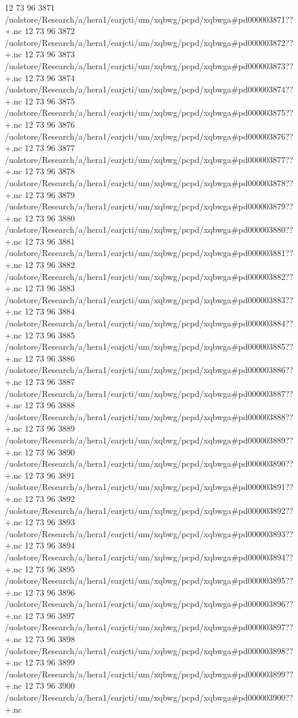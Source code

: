12 73 96
3871
/uolstore/Research/a/hera1/earjcti/um/xqbwg/pcpd/xqbwga#pd000003871??+.nc
12 73 96
3872
/uolstore/Research/a/hera1/earjcti/um/xqbwg/pcpd/xqbwga#pd000003872??+.nc
12 73 96
3873
/uolstore/Research/a/hera1/earjcti/um/xqbwg/pcpd/xqbwga#pd000003873??+.nc
12 73 96
3874
/uolstore/Research/a/hera1/earjcti/um/xqbwg/pcpd/xqbwga#pd000003874??+.nc
12 73 96
3875
/uolstore/Research/a/hera1/earjcti/um/xqbwg/pcpd/xqbwga#pd000003875??+.nc
12 73 96
3876
/uolstore/Research/a/hera1/earjcti/um/xqbwg/pcpd/xqbwga#pd000003876??+.nc
12 73 96
3877
/uolstore/Research/a/hera1/earjcti/um/xqbwg/pcpd/xqbwga#pd000003877??+.nc
12 73 96
3878
/uolstore/Research/a/hera1/earjcti/um/xqbwg/pcpd/xqbwga#pd000003878??+.nc
12 73 96
3879
/uolstore/Research/a/hera1/earjcti/um/xqbwg/pcpd/xqbwga#pd000003879??+.nc
12 73 96
3880
/uolstore/Research/a/hera1/earjcti/um/xqbwg/pcpd/xqbwga#pd000003880??+.nc
12 73 96
3881
/uolstore/Research/a/hera1/earjcti/um/xqbwg/pcpd/xqbwga#pd000003881??+.nc
12 73 96
3882
/uolstore/Research/a/hera1/earjcti/um/xqbwg/pcpd/xqbwga#pd000003882??+.nc
12 73 96
3883
/uolstore/Research/a/hera1/earjcti/um/xqbwg/pcpd/xqbwga#pd000003883??+.nc
12 73 96
3884
/uolstore/Research/a/hera1/earjcti/um/xqbwg/pcpd/xqbwga#pd000003884??+.nc
12 73 96
3885
/uolstore/Research/a/hera1/earjcti/um/xqbwg/pcpd/xqbwga#pd000003885??+.nc
12 73 96
3886
/uolstore/Research/a/hera1/earjcti/um/xqbwg/pcpd/xqbwga#pd000003886??+.nc
12 73 96
3887
/uolstore/Research/a/hera1/earjcti/um/xqbwg/pcpd/xqbwga#pd000003887??+.nc
12 73 96
3888
/uolstore/Research/a/hera1/earjcti/um/xqbwg/pcpd/xqbwga#pd000003888??+.nc
12 73 96
3889
/uolstore/Research/a/hera1/earjcti/um/xqbwg/pcpd/xqbwga#pd000003889??+.nc
12 73 96
3890
/uolstore/Research/a/hera1/earjcti/um/xqbwg/pcpd/xqbwga#pd000003890??+.nc
12 73 96
3891
/uolstore/Research/a/hera1/earjcti/um/xqbwg/pcpd/xqbwga#pd000003891??+.nc
12 73 96
3892
/uolstore/Research/a/hera1/earjcti/um/xqbwg/pcpd/xqbwga#pd000003892??+.nc
12 73 96
3893
/uolstore/Research/a/hera1/earjcti/um/xqbwg/pcpd/xqbwga#pd000003893??+.nc
12 73 96
3894
/uolstore/Research/a/hera1/earjcti/um/xqbwg/pcpd/xqbwga#pd000003894??+.nc
12 73 96
3895
/uolstore/Research/a/hera1/earjcti/um/xqbwg/pcpd/xqbwga#pd000003895??+.nc
12 73 96
3896
/uolstore/Research/a/hera1/earjcti/um/xqbwg/pcpd/xqbwga#pd000003896??+.nc
12 73 96
3897
/uolstore/Research/a/hera1/earjcti/um/xqbwg/pcpd/xqbwga#pd000003897??+.nc
12 73 96
3898
/uolstore/Research/a/hera1/earjcti/um/xqbwg/pcpd/xqbwga#pd000003898??+.nc
12 73 96
3899
/uolstore/Research/a/hera1/earjcti/um/xqbwg/pcpd/xqbwga#pd000003899??+.nc
12 73 96
3900
/uolstore/Research/a/hera1/earjcti/um/xqbwg/pcpd/xqbwga#pd000003900??+.nc
